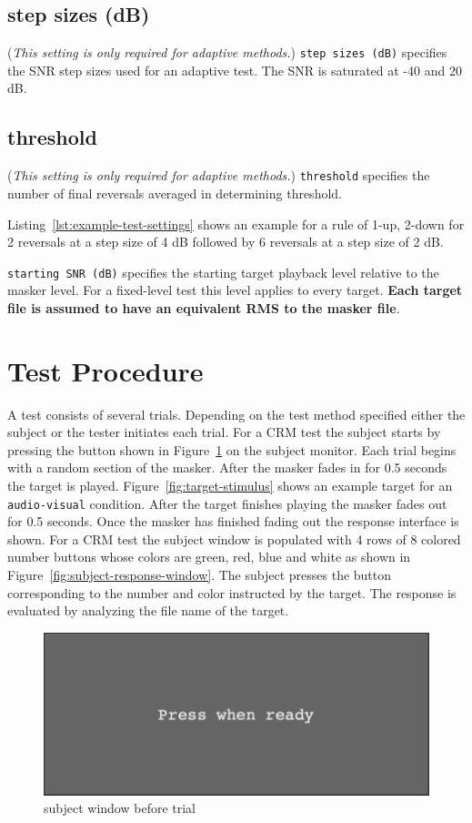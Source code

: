 \documentclass[11pt,pdftex,letterpaper]{article}
\begin{document}
\subsection{step sizes (dB)}
(\textit{This setting is only required for adaptive methods.}) \texttt{step sizes (dB)} specifies the SNR step sizes used for an adaptive test. The SNR is saturated at -40 and 20 dB.
\subsection{threshold}
(\textit{This setting is only required for adaptive methods.}) \texttt{threshold} specifies the number of final reversals averaged in determining threshold.

\vspace{\baselineskip}
Listing~\ref{lst:example-test-settings} shows an example for a rule of 1-up, 2-down for 2 reversals at a step size of 4 dB followed by 6 reversals at a step size of 2 dB.

\texttt{starting SNR (dB)} specifies the starting target playback level relative to the masker level. For a fixed-level test this level applies to every target. \textbf{Each target file is assumed to have an equivalent RMS to the masker file}.

\section{Test Procedure}
A test consists of several trials. Depending on the test method specified either the subject or the tester initiates each trial. For a CRM test the subject starts by pressing the button shown in Figure~\ref{fig:subject-ready-window} on the subject monitor. Each trial begins with a random section of the masker. After the masker fades in for 0.5 seconds the target is played. Figure~\ref{fig:target-stimulus} shows an example target for an \texttt{audio-visual} condition. After the target finishes playing the masker fades out for 0.5 seconds. Once the masker has finished fading out the response interface is shown. For a CRM test the subject window is populated with 4 rows of 8 colored number buttons whose colors are green, red, blue and white as shown in Figure~\ref{fig:subject-response-window}. The subject presses the button corresponding to the number and color instructed by the target. The response is evaluated by analyzing the file name of the target.

\begin{figure}
\centering
\includegraphics[width = 0.9\linewidth]{subject-ready-window.png}
\caption{subject window before trial}
\label{fig:subject-ready-window}
\end{figure}
\end{document}
